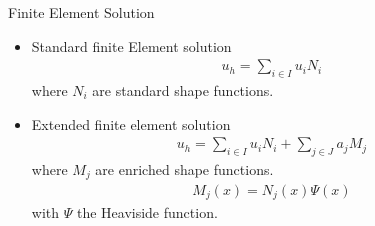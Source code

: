 \documentclass[10pt]{beamer}	%
\begin{document}
\begin{frame}{Finite Element Solution}
    \begin{itemize}
    \item Standard finite Element solution
    \begin{align}
        u_h = \sum_{i \in I} u_i N_i
    \end{align}
    where $N_i$ are standard shape functions.


    \item Extended finite element solution
    \begin{align}
        u_h = \sum_{i \in I} u_i N_i + \sum_{j \in J} a_j M_j
    \end{align}
    where $M_j$ are enriched shape functions.
    \begin{align}
    M_j(x) = N_j(x) \Psi(x)
    \end{align}
    with $\Psi$ the Heaviside function.
    \end{itemize}
%
\end{frame}
    
%
%
%
%
%
    
\end{document}
